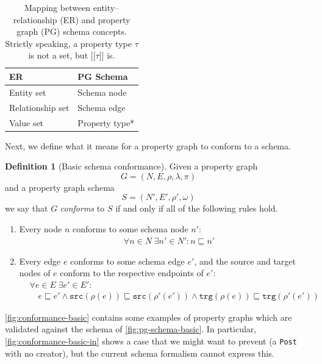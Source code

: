 \documentclass{report}
\theoremstyle{definition}
\newtheorem{definition}{Definition}
\newcommand{\src}{\mathtt{src}}
\newcommand{\trg}{\mathtt{trg}}
\newcommand{\ptype}{\tau}
\newcommand{\lsem}{\ensuremath{[\![}}
\newcommand{\rsem}{\ensuremath{]\!]}}
\newcommand{\sem}[1]{\ensuremath{\lsem #1 \rsem}}
\newcommand{\conf}{\sqsubseteq}
\begin{document}
\begin{table}[t]
  \centering
  \begin{tabular}{ll}
    \hline
    \textbf{ER}      & \textbf{PG Schema} \\
    \hline
    Entity set       & Schema node        \\
    Relationship set & Schema edge        \\
    Value set        & Property type*     \\
    \hline
  \end{tabular}
  \caption[Mapping between entity--relationship and property graph schema concepts]{Mapping between entity--relationship (ER) and property graph (PG) schema concepts. Strictly speaking, a property type $\ptype$ is not a set, but $\sem{\ptype}$ is.}
  \label{tab:er-pg-schema}
\end{table}

Next, we define what it means for a property graph to conform to a schema.

\begin{definition}[Basic schema conformance]
  \label{def:schema-conformance-basic}
  Given a property graph $$G = (N, E, \rho, \lambda, \pi)$$ and a property graph schema $$S = (N', E', \rho', \omega)$$ we say that $G$ \emph{conforms} to $S$ if and only if all of the following rules hold.

  \begin{enumerate}
    \item\label{rule:basic-node}
          Every node $n$ conforms to some schema node $n'$:
          \begin{align*}
             & \forall n \in N \; \exists n' \in N' : n \conf n'
          \end{align*}

    \item\label{rule:basic-edge}
          Every edge $e$ conforms to some schema edge $e'$, and the source and target nodes of $e$ conform to the respective endpoints of $e'$:
          \begin{align*}
             & \forall e \in E \; \exists e' \in E' :                      \\
             & \quad e \conf e' \wedge \src(\rho(e)) \conf \src(\rho'(e'))
            \wedge \trg(\rho(e)) \conf \trg(\rho'(e'))
          \end{align*}
  \end{enumerate}
\end{definition}

\autoref{fig:conformance-basic} contains some examples of property graphs which are validated against the schema of \autoref{fig:pg-schema-basic}. In particular, \autoref{fig:conformance-basic-in} shows a case that we might want to prevent (a \texttt{Post} with no creator), but the current schema formalism cannot express this.
\end{document}
